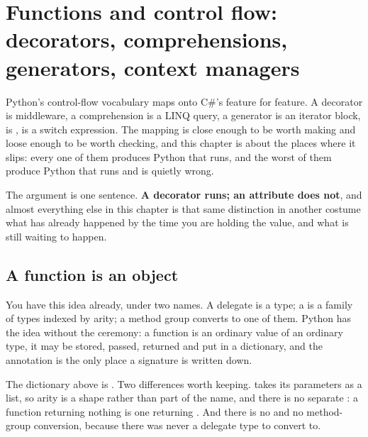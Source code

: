 
\chapter{Functions and control flow: decorators, comprehensions, generators, context managers}
\label{ch:functions}

\noindent
Python's control-flow vocabulary maps onto C\#'s feature for feature. A
decorator is middleware, a comprehension is a LINQ query, a generator is an
iterator block,  is ,  is a switch
expression. The mapping is close enough to be worth making and loose enough
to be worth checking, and this chapter is about the places where it slips:
every one of them produces Python that runs, and the worst of them
produce Python that runs and is quietly wrong.

The argument is one sentence. \textbf{A decorator runs; an attribute does
not}, and almost everything else in this chapter is that same distinction
in another costume \dash{} what has already happened by the time you are
holding the value, and what is still waiting to happen.

\section{A function is an object}
\label{sec:ch05-first-class}

You have this idea already, under two names. A delegate is a type; a
 is a family of types indexed by arity; a method group
converts to one of them. Python has the idea without the ceremony: a
function is an ordinary value of an ordinary type, it may be stored,
passed, returned and put in a dictionary, and the annotation is the only
place a signature is written down.


\begin{csbox}
The dictionary above is . Two
differences worth keeping.  takes its parameters as a list,
so arity is a shape rather than part of the name, and there is no separate
: a function returning nothing is one returning .
And there is no  and no method-group conversion, because there
was never a delegate type to convert to.
\end{csbox}

